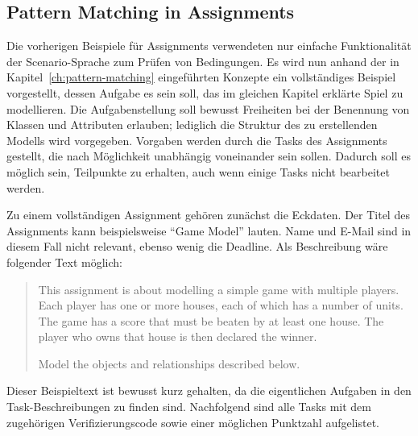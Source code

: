 \subsection{Pattern Matching in Assignments}\label{subsec:assignment-pattern-matching}

Die vorherigen Beispiele für Assignments verwendeten nur einfache Funktionalität der Scenario-Sprache zum Prüfen von Bedingungen.
Es wird nun anhand der in Kapitel~\ref{ch:pattern-matching} eingeführten Konzepte ein vollständiges Beispiel vorgestellt, dessen Aufgabe es sein soll, das im gleichen Kapitel erklärte Spiel zu modellieren.
Die Aufgabenstellung soll bewusst Freiheiten bei der Benennung von Klassen und Attributen erlauben;
lediglich die Struktur des zu erstellenden Modells wird vorgegeben.
Vorgaben werden durch die Tasks des Assignments gestellt, die nach Möglichkeit unabhängig voneinander sein sollen.
Dadurch soll es möglich sein, Teilpunkte zu erhalten, auch wenn einige Tasks nicht bearbeitet werden.

Zu einem vollständigen Assignment gehören zunächst die Eckdaten.
Der Titel des Assignments kann beispielsweise ``Game Model'' lauten.
Name und E-Mail sind in diesem Fall nicht relevant, ebenso wenig die Deadline.
Als Beschreibung wäre folgender Text möglich:

\begin{quote}
    This assignment is about modelling a simple game with multiple players.
    Each player has one or more houses, each of which has a number of units.
    The game has a score that must be beaten by at least one house.
    The player who owns that house is then declared the winner.

    Model the objects and relationships described below.
\end{quote}

Dieser Beispieltext ist bewusst kurz gehalten, da die eigentlichen Aufgaben in den Task-Beschreibungen zu finden sind.
Nachfolgend sind alle Tasks mit dem zugehörigen Verifizierungscode sowie einer möglichen Punktzahl aufgelistet.


